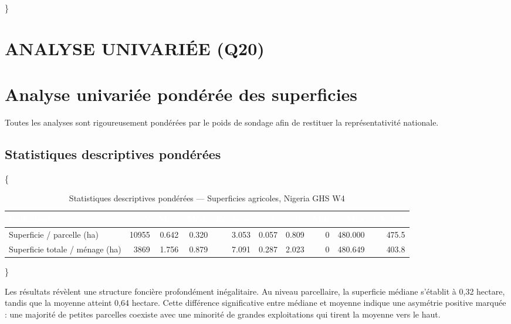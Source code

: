 \documentclass[
  french,
  10pt,
]{article}
\begin{document}
\}

\section{ANALYSE UNIVARIÉE (Q20)}\label{analyse-univariuxe9e-q20}

\section{Analyse univariée pondérée des superficies}\label{tache20}

Toutes les analyses sont rigoureusement pondérées par le poids de
sondage afin de restituer la représentativité nationale.

\subsection{Statistiques descriptives
pondérées}\label{statistiques-descriptives-ponduxe9ruxe9es}

\{ \small {}

\begin{table}

\caption{\label{tab:stats-table}Statistiques descriptives pondérées --- Superficies agricoles, Nigeria GHS W4}
\centering
\begin{tabular}[t]{lrrrrrrrrr}
\toprule
\cellcolor{NavyBlue}\textcolor{white}{\textbf{Indicateur}} & \cellcolor{NavyBlue}\textcolor{white}{\textbf{$N$}} & \cellcolor{NavyBlue}\textcolor{white}{\textbf{Moy.}} & \cellcolor{NavyBlue}\textcolor{white}{\textbf{Méd.}} & \cellcolor{NavyBlue}\textcolor{white}{\textbf{Éc.-type}} & \cellcolor{NavyBlue}\textcolor{white}{\textbf{$Q_1$}} & \cellcolor{NavyBlue}\textcolor{white}{\textbf{$Q_3$}} & \cellcolor{NavyBlue}\textcolor{white}{\textbf{Min}} & \cellcolor{NavyBlue}\textcolor{white}{\textbf{Max}} & \cellcolor{NavyBlue}\textcolor{white}{\textbf{CV (\%)}}\\
\midrule
Superficie / parcelle (ha) & 10955 & 0.642 & 0.320 & 3.053 & 0.057 & 0.809 & 0 & 480.000 & 475.5\\
Superficie totale / ménage (ha) & 3869 & 1.756 & 0.879 & 7.091 & 0.287 & 2.023 & 0 & 480.649 & 403.8\\
\bottomrule
\end{tabular}
\end{table}

\}

Les résultats révèlent une structure foncière profondément inégalitaire.
Au niveau parcellaire, la superficie médiane s'établit à 0,32 hectare,
tandis que la moyenne atteint 0,64 hectare. Cette différence
significative entre médiane et moyenne indique une asymétrie positive
marquée : une majorité de petites parcelles coexiste avec une minorité
de grandes exploitations qui tirent la moyenne vers le haut.
\end{document}
